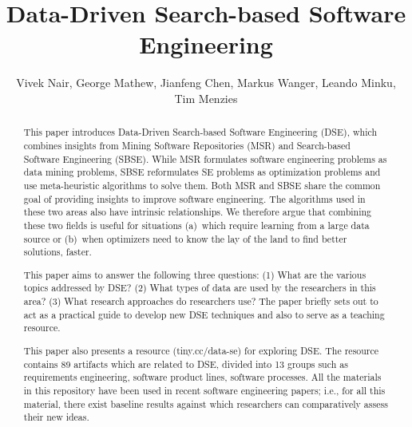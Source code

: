 \documentclass[sigconf,anonymous,review]{acmart}
\begin{document}
\title{Data-Driven Search-based Software Engineering}

\author{Vivek Nair, George Mathew, Jianfeng Chen, Markus Wanger, Leando Minku, Tim Menzies}
\email{}


\begin{abstract}
This paper introduces Data-Driven Search-based Software Engineering (DSE), which combines insights from Mining Software Repositories (MSR) and Search-based Software Engineering (SBSE). While MSR formulates software engineering problems as data mining problems, SBSE reformulates SE problems as optimization problems and use meta-heuristic algorithms to solve them. Both MSR and SBSE share the common goal of providing insights to improve software engineering. The algorithms used in these two areas also have intrinsic relationships.  
We therefore argue that combining these two fields
is useful for situations (a)~which require learning from a large data
source or (b)~when optimizers need to know the lay of the land to find better solutions, faster.

This paper aims to answer the following three questions: (1) What are the various topics addressed by DSE? (2) What types of data are used by the researchers in this area? (3) What research approaches do researchers use? The paper briefly sets out to act as a practical guide to develop new DSE techniques and also to serve as a teaching resource.

This paper also presents a  resource (tiny.cc/data-se) for exploring DSE.  The resource contains 89 artifacts which are related to DSE,
divided into 13 groups such as requirements engineering, software product lines, software processes.
All the materials in this repository
have been   used in recent software engineering papers; i.e., for all this material, there exist baseline results against which researchers can comparatively assess their new ideas.




\end{abstract}
\end{document}
